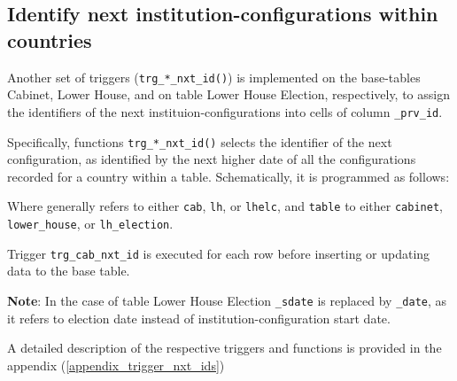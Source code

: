 \subsection{Identify next institution-configurations within countries}\label{trg_prv_ids}
Another set of triggers (\texttt{\footnotesize trg\_*\_nxt\_id()}) is implemented on the base-tables Cabinet, Lower House, and on table Lower House Election, respectively, to assign the identifiers of the next instituion-configurations into cells of column \texttt{\footnotesize *\_prv\_id}.

Specifically, functions \texttt{\footnotesize trg\_*\_nxt\_id()} selects the identifier of the next  configuration, as identified by the next higher date of all the configurations recorded for a country within a table.
Schematically, it is programmed as follows:


Where generally \texttt{\footnotesize *} refers to either \texttt{\footnotesize cab}, \texttt{\footnotesize lh}, or \texttt{\footnotesize lhelc}, and \texttt{\footnotesize *table} to either \texttt{\footnotesize cabinet}, \texttt{\footnotesize lower\_house}, or \texttt{\footnotesize lh\_election}.

Trigger \texttt{\footnotesize trg\_cab\_nxt\_id} is executed for each row before inserting or updating data to the base table.

{\bf Note}: In the case of table Lower House Election \texttt{\footnotesize \_sdate} is replaced by \texttt{\footnotesize \_date}, as it refers to election date instead of institution-configuration start date.

A detailed description of the respective triggers and functions is provided in the appendix (\ref{appendix_trigger_nxt_ids})

